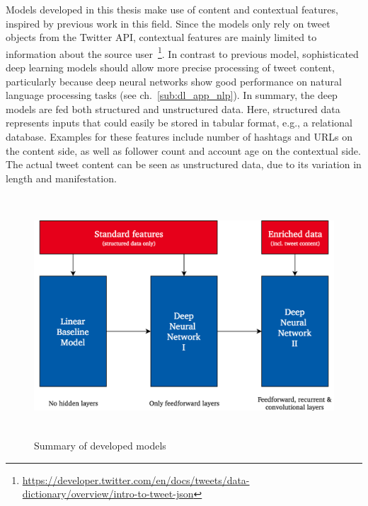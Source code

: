 Models developed in this thesis make use of content and contextual features,
inspired by previous work in this field.
Since the models only rely on tweet objects from the Twitter API, contextual
features are mainly limited to information about the source user~\footnote{\url{https://developer.twitter.com/en/docs/tweets/data-dictionary/overview/intro-to-tweet-json}}.
In contrast to previous model, sophisticated deep learning models should allow
more precise processing of tweet content, particularly because deep neural networks
show good performance on natural language processing tasks (see ch.~\ref{sub:dl_app_nlp}).
In summary, the deep models are fed both structured and unstructured data.
Here, structured data represents inputs that could easily be stored in
tabular format, e.g., a relational database.
Examples for these features include number of hashtags and URLs on the content
side, as well as follower count and account age on the contextual side.
The actual tweet content can be seen as unstructured data, due to its variation
in length and manifestation.

\begin{figure}[h]
  \centering
  \includegraphics[height=9cm]{img/model_summary}
  \caption{Summary of developed models}
\label{fig:model_summary}
\end{figure}

